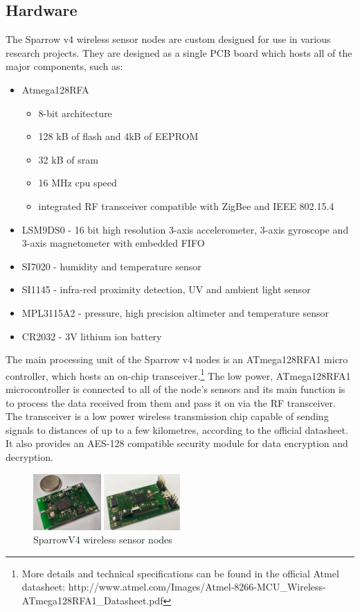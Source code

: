 \subsection{Hardware}

The Sparrow v4 wireless sensor nodes are custom designed for use in various research projects.
They are designed as a single PCB board which hosts all of the major components, such as:
\begin{itemize}
    \item Atmega128RFA
        \begin{itemize}
            \item 8-bit architecture
            \item 128 kB of flash and 4kB of EEPROM
            \item 32 kB of sram
            \item 16 MHz cpu speed
            \item integrated RF transceiver compatible with ZigBee and IEEE 802.15.4
        \end{itemize}
    \item LSM9DS0 - 16 bit high resolution 3-axis accelerometer, 3-axis gyroscope and 3-axis
        magnetometer with embedded FIFO
    \item SI7020 - humidity and temperature sensor
    \item SI1145 - infra-red proximity detection, UV and ambient light sensor
    \item MPL3115A2 - pressure, high precision altimeter and temperature sensor
    \item CR2032 - 3V lithium ion battery
\end{itemize}

The main processing unit of the Sparrow v4 nodes is an ATmega128RFA1 micro controller, 
which hosts an on-chip transceiver.\footnote{More details and technical specifications can be found in the official Atmel datasheet: http://www.atmel.com/Images/Atmel-8266-MCU_Wireless-ATmega128RFA1_Datasheet.pdf} 
The low power, ATmega128RFA1 microcontroller is connected to all of the node's sensors and its
main function is to process the data received from them and pass it on via the RF transceiver. The transceiver 
is a low power wireless transmission chip capable of sending signals to distances of up to a few kilometres, according 
to the official datasheet. It also provides an AES-128 compatible security module for data encryption and decryption.

\begin{figure}[ht] \centering
  \includegraphics[width=0.5\textwidth]{img/sparrow-v4.png}
  \caption{SparrowV4 wireless sensor nodes}
\end{figure}

